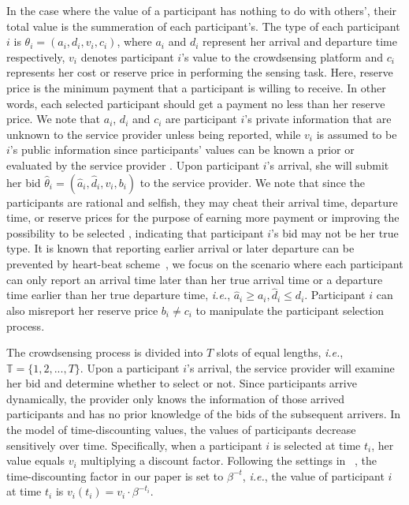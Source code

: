 \documentclass[10pt,journal,letterpaper,compsoc]{IEEEtran}
\newcommand{\ie}{{\em i.e.}}
\begin{document}
In the case where the value of a participant has nothing to do with others', their total value is the summeration of each participant's. The type of each participant $i$ is $\theta_i=(a_i,d_i,v_i,c_i)$, where $a_i$ and $d_i$ represent her arrival and departure time respectively, $v_i$ denotes participant $i$'s value to the crowdsensing platform and $c_i$ represents her cost or reserve price in performing the sensing task. Here, reserve price is the minimum payment that a participant is willing to receive. In other words, each selected participant should get a payment no less than her reserve price. We note that $a_i$, $d_i$ and $c_i$ are participant $i$'s private information that are unknown to the service provider unless being reported, while $v_i$ is assumed to be $i$'s public information since participants' values can be known a prior or evaluated by the service provider \cite{peng2015pay,jin2015quality}. Upon participant $i$'s arrival, she will submit her bid $\hat{\theta}_i=(\hat{a}_i,\hat{d}_i,v_i,b_i)$ to the service provider. We note that since the participants are rational and selfish, they may cheat their arrival time, departure time, or reserve prices for the purpose of earning more payment or improving the possibility to be selected \cite{nisan2007algorithmic}, indicating that participant $i$'s bid may not be her true type. It is known that reporting earlier arrival or later departure can be prevented by heart-beat scheme~\cite{nisan2007algorithmic}, we focus on the scenario where each participant can only report an arrival time later than her true arrival time or a departure time earlier than her true departure time, \ie, $\hat{a}_i\ge a_i, \hat{d}_i\le d_i$. Participant $i$ can also misreport her reserve price $b_i \neq c_i$ to manipulate the participant selection process.

The crowdsensing process is divided into $T$ slots of equal lengths, \ie, $\mathbb{T}=\{1,2,..., T\}$. Upon a participant $i$'s arrival, the service provider will examine her bid and determine whether to select or not. Since participants arrive dynamically, the provider only knows the information of those arrived participants and has no prior knowledge of the bids of the subsequent arrivers. In the model of time-discounting values, the values of participants decrease sensitively over time. Specifically, when a participant $i$ is selected at time $t_i$, her value equals $v_i$ multiplying a discount factor. Following the settings in ~\cite{rasmussen1975choosing}, the time-discounting factor in our paper is set to $\beta^{-t}$, \ie, the value of participant $i$ at time $t_i$ is $v_i(t_i)=v_i \cdot \beta^{-t_i}$.
\end{document}
